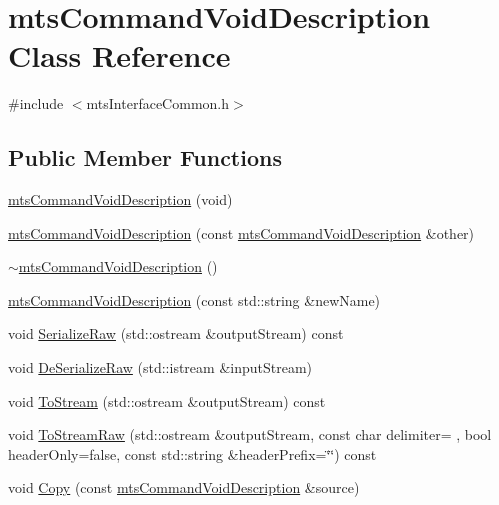 \hypertarget{classmts_command_void_description}{}\section{mts\+Command\+Void\+Description Class Reference}
\label{classmts_command_void_description}


{\ttfamily \#include $<$mts\+Interface\+Common.\+h$>$}

\subsection*{Public Member Functions}
\begin{DoxyCompactItemize}
\item 
\hyperlink{classmts_command_void_description_a5bc3aaec85b7b36e4ff84c63d8deae5f}{mts\+Command\+Void\+Description} (void)
\item 
\hyperlink{classmts_command_void_description_a9d040531c92ea4c8b02acd69031775e1}{mts\+Command\+Void\+Description} (const \hyperlink{classmts_command_void_description}{mts\+Command\+Void\+Description} \&other)
\item 
\hyperlink{classmts_command_void_description_a13158a67e2f4eba24a026a8771b43ee4}{$\sim$mts\+Command\+Void\+Description} ()
\item 
\hyperlink{classmts_command_void_description_a76e960109615ad44e99ab5bdde8369f8}{mts\+Command\+Void\+Description} (const std\+::string \&new\+Name)
\item 
void \hyperlink{classmts_command_void_description_a340a0e0c0143ddc712a10eaf48c478ed}{Serialize\+Raw} (std\+::ostream \&output\+Stream) const 
\item 
void \hyperlink{classmts_command_void_description_a39b8a55124bff411f5b7a6adbed0f306}{De\+Serialize\+Raw} (std\+::istream \&input\+Stream)
\item 
void \hyperlink{classmts_command_void_description_afca052335615fb80fa73ff7a2a64e10e}{To\+Stream} (std\+::ostream \&output\+Stream) const 
\item 
void \hyperlink{classmts_command_void_description_aed5f7ee865cf462b23334ba1ff451ddd}{To\+Stream\+Raw} (std\+::ostream \&output\+Stream, const char delimiter= \textquotesingle{} \textquotesingle{}, bool header\+Only=false, const std\+::string \&header\+Prefix=\char`\"{}\char`\"{}) const 
\item 
void \hyperlink{classmts_command_void_description_ac85ea01d42186b9ff3edd54ac348b84d}{Copy} (const \hyperlink{classmts_command_void_description}{mts\+Command\+Void\+Description} \&source)

\end{DoxyCompactItemize}
